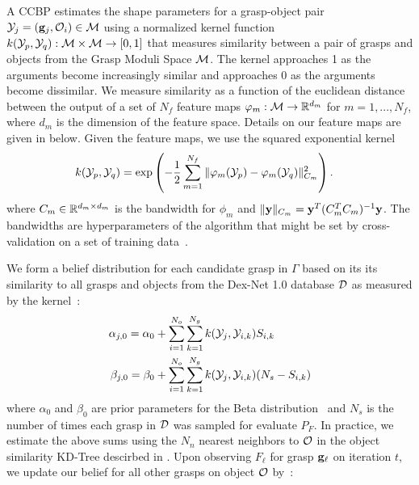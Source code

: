 A CCBP estimates the shape parameters for a grasp-object pair $\mathcal{Y}_{j} = (\mathbf{g}_{j}, \mathcal{O}_{i}) \in \mathcal{M}$ using a normalized kernel function $k(\mathcal{Y}_p, \mathcal{Y}_q) : \mathcal{M} \times \mathcal{M} \rightarrow [0,1]$ that measures similarity between a pair of grasps and objects from the Grasp Moduli Space $\mathcal{M}$.
The kernel approaches 1 as the arguments become increasingly similar and approaches 0 as the arguments become dissimilar.
We measure similarity as a function of the euclidean distance between the output of a set of $N_f$ feature maps $\varphi_m: \mathcal{M} \rightarrow \mathbb{R}^{d_m}$ for $m = 1, ..., N_f$, where $d_m$ is the dimension of the feature space.
Details on our feature maps are given in  below.
Given the feature maps, we use the squared exponential kernel 
\begin{align*}
	k(\mathcal{Y}_p, \mathcal{Y}_q) &= \exp\left( - \frac{1}{2} \sum \limits_{m=1}^{N_f} \|\varphi_m(\mathcal{Y}_p) - \varphi_m(\mathcal{Y}_q)\|_{C_m}^2 \right).
\end{align*}
\noindent where $C_m \in \mathbb{R}^{d_m \times d_m}$ is the bandwidth for $\phi_m$ and $\| \mathbf{y} \|_{C_m} = \mathbf{y}^T (C_m^T C_m)^{-1} \mathbf{y}$.
The bandwidths are hyperparameters of the algorithm that might be set by cross-validation on a set of training data~\cite{rasmussen2006}.

We form a belief distribution for each candidate grasp in $\Gamma$ based on its its similarity to all grasps and objects from the Dex-Net 1.0 database $\mathcal{D}$ as measured by the kernel~\cite{goetschalckx2011continuous}:
\begin{align}
	\alpha_{j,0} = \alpha_{0} & + \sum \limits_{i=1}^{N_o} \sum \limits_{k=1}^{N_g} k(\mathcal{Y}_{j}, \mathcal{Y}_{i, k}) S_{i,k} \label{eq:alpha-prior} \\
	\beta_{j,0} = \beta_{0} & + \sum \limits_{i=1}^{N_o} \sum \limits_{k=1}^{N_g}  k(\mathcal{Y}_{j}, \mathcal{Y}_{i,k}) (N_s - S_{i,k}) \label{eq:beta-prior}
\end{align}
\noindent where $\alpha_{0}$ and $\beta_{0}$ are prior parameters for the Beta distribution~\cite{laskey2015bandits} and $N_s$ is the number of times each grasp in $\mathcal{D}$ was sampled for evaluate $P_F$.
In practice, we estimate the above sums using the $N_n$ nearest neighbors to $\mathcal{O}$ in the object similarity KD-Tree descirbed in .
Upon observing $F_{\ell}$ for grasp $\mathbf{g}_{\ell}$ on iteration $t$, we update our belief for all other grasps on object $\mathcal{O}$ by~\cite{goetschalckx2011continuous}:

